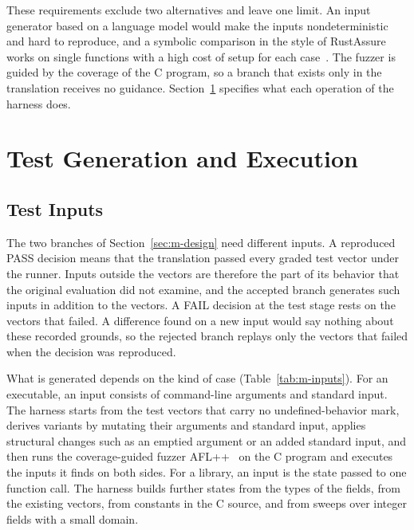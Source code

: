 These requirements exclude two alternatives and leave one limit. An input generator based on a language model would make the inputs nondeterministic and hard to reproduce, and a symbolic comparison in the style of RustAssure works on single functions with a high cost of setup for each case~\cite{bai2025rustassure}. The fuzzer is guided by the coverage of the C program, so a branch that exists only in the translation receives no guidance. Section~\ref{sec:m-execution} specifies what each operation of the harness does.

\section{Test Generation and Execution}\label{sec:m-execution}

\subsection{Test Inputs}\label{sec:m-inputs}

The two branches of Section~\ref{sec:m-design} need different inputs. A reproduced PASS decision means that the translation passed every graded test vector under the runner. Inputs outside the vectors are therefore the part of its behavior that the original evaluation did not examine, and the accepted branch generates such inputs in addition to the vectors. A FAIL decision at the test stage rests on the vectors that failed. A difference found on a new input would say nothing about these recorded grounds, so the rejected branch replays only the vectors that failed when the decision was reproduced.

What is generated depends on the kind of case (Table~\ref{tab:m-inputs}). For an executable, an input consists of command-line arguments and standard input. The harness starts from the test vectors that carry no undefined-behavior mark, derives variants by mutating their arguments and standard input, applies structural changes such as an emptied argument or an added standard input, and then runs the coverage-guided fuzzer AFL++~\cite{fioraldi2020aflpp} on the C program and executes the inputs it finds on both sides. For a library, an input is the state passed to one function call. The harness builds further states from the types of the fields, from the existing vectors, from constants in the C source, and from sweeps over integer fields with a small domain.

